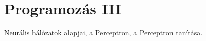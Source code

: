 \documentclass[../../main.tex]{subfiles}
\begin{document}
\section{Programozás III}

\begin{fulltheorem}
	Neurális hálózatok alapjai, a Perceptron, a Perceptron tanítása.
\end{fulltheorem}
\end{document}
